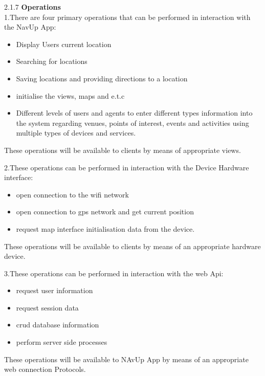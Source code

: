 \documentclass[11pt]{article}
\begin{document}
\begin{flushleft}
\item 2.1.7 \textbf{Operations}\\
1.There are four primary operations that can be performed in interaction with the NavUp App:\\
\begin{itemize}
\item Display Users current location\\
\item Searching for locations\\
\item Saving locations and providing directions to a location\\
\item initialise the views, maps and e.t.c\\
\item Different levels of users and agents to enter different types information into the system regarding venues, points of interest, events and activities using multiple types of devices and services.\\
\end{itemize}
These operations will be available to clients by means of appropriate views.\newline


2.These operations can be performed in interaction with the Device Hardware interface:\\
\begin{itemize}
\item open connection to the  wifi network\\ 	
\item open connection to gps network and get current position\\
\item request map interface initialisation data from the device.\\
 \end{itemize}
These operations will be available to clients by means of an appropriate hardware device.\newline

3.These operations  can be performed in interaction with the web Api:\\
\begin{itemize}
\item request user information 	\\
\item request session data\\
\item crud database information \\
\item perform server side processes \\
 \end{itemize}
These operations will be available to NAvUp App by means of an appropriate web connection Protocols.\newline


\end{flushleft}
\end{document}
